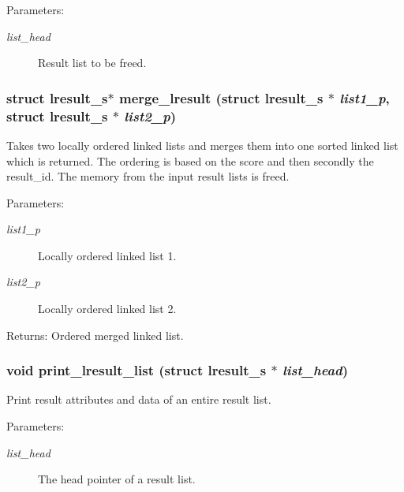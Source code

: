 \begin{Desc}
\item[Parameters:]
\begin{description}
\item[{\em list\_\-head}]Result list to be freed. \end{description}
\end{Desc}
\subsubsection{\setlength{\rightskip}{0pt plus 5cm}struct \bf{lresult\_\-s}$\ast$ merge\_\-lresult (struct \bf{lresult\_\-s} $\ast$ {\em list1\_\-p}, struct \bf{lresult\_\-s} $\ast$ {\em list2\_\-p})}\label{llist_8c_728f7e25f4f7dc970864ef9705192840}


Takes two locally ordered linked lists and merges them into one sorted linked list which is returned. The ordering is based on the score and then secondly the result\_\-id. The memory from the input result lists is freed.

\begin{Desc}
\item[Parameters:]
\begin{description}
\item[{\em list1\_\-p}]Locally ordered linked list 1. \item[{\em list2\_\-p}]Locally ordered linked list 2. \end{description}
\end{Desc}
\begin{Desc}
\item[Returns:]Ordered merged linked list. \end{Desc}
\subsubsection{\setlength{\rightskip}{0pt plus 5cm}void print\_\-lresult\_\-list (struct \bf{lresult\_\-s} $\ast$ {\em list\_\-head})}\label{llist_8c_4f96c1bf84a36cd8002686a09f73619a}


Print result attributes and data of an entire result list.

\begin{Desc}
\item[Parameters:]
\begin{description}
\item[{\em list\_\-head}]The head pointer of a result list. \end{description}
\end{Desc}
